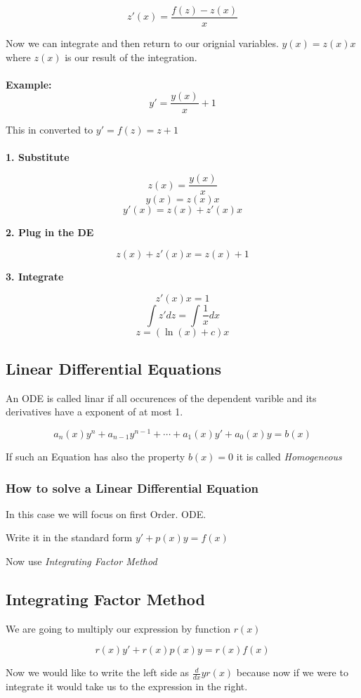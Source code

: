 \[
z'(x) = \frac{f(z) - z(x)}{x}
\]

Now we can integrate and then return to our orignial variables. \(y(x) = z(x) x\) where \(z(x)\) is our
result of the integration.
\\\\
\textbf{Example:}
\[y' = \frac{y(x)}{x} + 1\]

This in converted to \(y' = f(z) = z + 1\)
\\\\
\textbf{1. Substitute}

\[z(x) = \frac{y(x)}{x}\]
\[y(x) = z(x)x\]
\[y'(x) = z(x) + z'(x)x\]

\textbf{2. Plug in the DE}

\[z(x) + z'(x)x = z(x) + 1\]

\textbf{3. Integrate}

\[z'(x)x = 1\]
\[\int z' dz = \int \frac{1}{x} dx\]
\[z = (\ln(x) + c)x\]

\subsection{Linear Differential Equations}

An ODE is called linar if all occurences of the dependent varible and its
derivatives have a exponent of at most 1.

\[a_n(x)y^n + a_{n - 1}y^{n -1} + \cdots + a_1(x)y' + a_0(x)y = b(x)\]

If such an Equation has also the property \(b(x) = 0\) it is called \emph{Homogeneous}

\subsubsection{How to solve a Linear Differential Equation}

In this case we will focus on first Order. ODE.

Write it in the standard form \(y' + p(x)y = f(x)\)

Now use \emph{Integrating Factor Method}

\subsection{Integrating Factor Method}

We are going to multiply our expression by function \(r(x)\) 

\[r(x)y' + r(x)p(x)y = r(x)f(x)\]

Now we would like to write the left side as \(\frac{d}{dx} y r(x)\) because now if we
were to integrate it would take us to the expression in the right.

